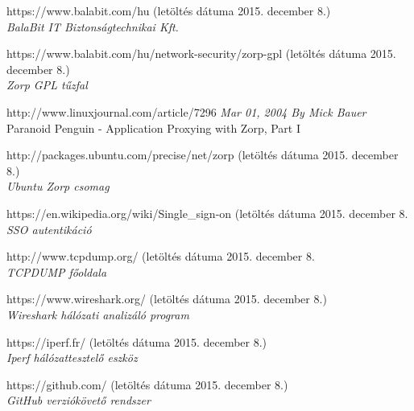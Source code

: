 \documentclass[a4paper,12pt,oneside]{report}
\begin{document}
\newpage
%
%

\begin{thebibliography}{99}

        https://www.balabit.com/hu 
        (letöltés dátuma 2015. december 8.)\\
        {\em BalaBit IT Biztonságtechnikai Kft. \\}     

        https://www.balabit.com/hu/network-security/zorp-gpl
        (letöltés dátuma 2015. december 8.)\\
        {\em Zorp GPL tűzfal \\}     

		http://www.linuxjournal.com/article/7296
        {\em Mar 01, 2004  By Mick Bauer \\}     
        Paranoid Penguin - Application Proxying with Zorp, Part I 
        
        http://packages.ubuntu.com/precise/net/zorp
        (letöltés dátuma 2015. december 8.)\\
        {\em Ubuntu Zorp csomag \\}    
    
        https://en.wikipedia.org/wiki/Single\_sign-on
        (letöltés dátuma 2015. december 8. \\
        {\em SSO autentikáció \\}
           
        http://www.tcpdump.org/
        (letöltés dátuma 2015. december 8. \\
        {\em TCPDUMP főoldala\\}     
        
         https://www.wireshark.org/
         (letöltés dátuma 2015. december 8.)\\
        {\em Wireshark hálózati analizáló program \\}         
        
        https://iperf.fr/
        (letöltés dátuma 2015. december 8.)\\
        {\em Iperf hálózattesztelő eszköz \\}
       
                       
		https://github.com/
		(letöltés dátuma 2015. december 8.)\\
        {\em GitHub verziókövető rendszer\\}
        

\end{thebibliography}
\end{document}
